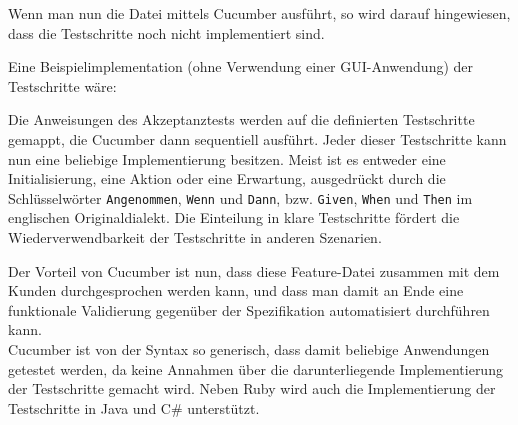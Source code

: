 Wenn man nun die Datei mittels Cucumber ausführt, so wird darauf hingewiesen, dass die Testschritte noch nicht implementiert sind.

Eine Beispielimplementation (ohne Verwendung einer GUI-Anwendung) der Testschritte wäre:
\begin{ruby}[label=steps.rb]
   
     

  
    

  
    
 
\end{ruby}
Die Anweisungen des Akzeptanztests werden auf die definierten Testschritte gemappt, die Cucumber dann sequentiell ausführt. 
Jeder dieser Testschritte kann nun eine beliebige Implementierung besitzen. Meist ist es entweder eine Initialisierung, eine Aktion oder eine Erwartung, ausgedrückt durch die Schlüsselwörter \texttt{Angenommen}, \texttt{Wenn} und \texttt{Dann}, bzw. \texttt{Given}, \texttt{When} und \texttt{Then} im englischen Originaldialekt. Die Einteilung in klare Testschritte fördert die Wiederverwendbarkeit der Testschritte in anderen Szenarien.

Der Vorteil von Cucumber ist nun, dass diese Feature-Datei zusammen mit dem Kunden durchgesprochen werden kann, und dass man damit an Ende eine funktionale Validierung gegenüber der Spezifikation automatisiert durchführen kann. \\ 
Cucumber ist von der Syntax so generisch, dass damit beliebige Anwendungen getestet werden, da keine Annahmen über die darunterliegende Implementierung der Testschritte gemacht wird.
Neben Ruby wird auch die Implementierung der Testschritte in Java und C\# unterstützt.

